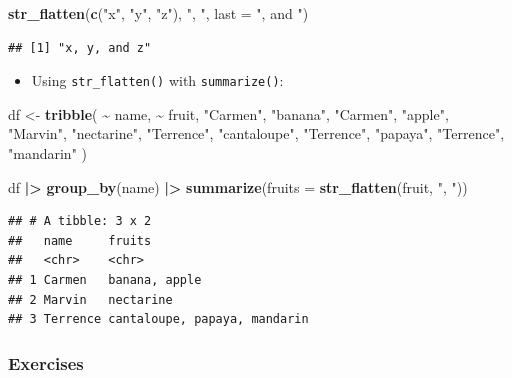 \documentclass[
]{article}
\newenvironment{Shaded}{\begin{snugshade}}{\end{snugshade}}
\newcommand{\AttributeTok}[1]{\textcolor[rgb]{0.13,0.29,0.53}{#1}}
\newcommand{\FunctionTok}[1]{\textcolor[rgb]{0.13,0.29,0.53}{\textbf{#1}}}
\newcommand{\NormalTok}[1]{#1}
\newcommand{\OtherTok}[1]{\textcolor[rgb]{0.56,0.35,0.01}{#1}}
\newcommand{\SpecialCharTok}[1]{\textcolor[rgb]{0.81,0.36,0.00}{\textbf{#1}}}
\newcommand{\StringTok}[1]{\textcolor[rgb]{0.31,0.60,0.02}{#1}}
\providecommand{\tightlist}{%
  \setlength{\itemsep}{0pt}\setlength{\parskip}{0pt}}
\begin{document}
\begin{Shaded}
\begin{Highlighting}[]
\FunctionTok{str\_flatten}\NormalTok{(}\FunctionTok{c}\NormalTok{(}\StringTok{"x"}\NormalTok{, }\StringTok{"y"}\NormalTok{, }\StringTok{"z"}\NormalTok{), }\StringTok{", "}\NormalTok{, }\AttributeTok{last =} \StringTok{", and "}\NormalTok{)}
\end{Highlighting}
\end{Shaded}

\begin{verbatim}
## [1] "x, y, and z"
\end{verbatim}

\begin{itemize}
\tightlist
\item
  Using \texttt{str\_flatten()} with \texttt{summarize()}:
\end{itemize}

\begin{Shaded}
\begin{Highlighting}[]
\NormalTok{df }\OtherTok{\textless{}{-}} \FunctionTok{tribble}\NormalTok{(}
  \SpecialCharTok{\textasciitilde{}}\NormalTok{ name, }\SpecialCharTok{\textasciitilde{}}\NormalTok{ fruit,}
  \StringTok{"Carmen"}\NormalTok{, }\StringTok{"banana"}\NormalTok{,}
  \StringTok{"Carmen"}\NormalTok{, }\StringTok{"apple"}\NormalTok{,}
  \StringTok{"Marvin"}\NormalTok{, }\StringTok{"nectarine"}\NormalTok{,}
  \StringTok{"Terrence"}\NormalTok{, }\StringTok{"cantaloupe"}\NormalTok{,}
  \StringTok{"Terrence"}\NormalTok{, }\StringTok{"papaya"}\NormalTok{,}
  \StringTok{"Terrence"}\NormalTok{, }\StringTok{"mandarin"}
\NormalTok{)}

\NormalTok{df }\SpecialCharTok{|\textgreater{}} 
  \FunctionTok{group\_by}\NormalTok{(name) }\SpecialCharTok{|\textgreater{}} 
  \FunctionTok{summarize}\NormalTok{(}\AttributeTok{fruits =} \FunctionTok{str\_flatten}\NormalTok{(fruit, }\StringTok{", "}\NormalTok{))}
\end{Highlighting}
\end{Shaded}

\begin{verbatim}
## # A tibble: 3 x 2
##   name     fruits                      
##   <chr>    <chr>                       
## 1 Carmen   banana, apple               
## 2 Marvin   nectarine                   
## 3 Terrence cantaloupe, papaya, mandarin
\end{verbatim}

\subsubsection{Exercises}\label{exercises-1}
\end{document}
